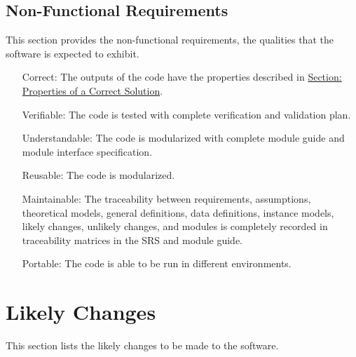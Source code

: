 \documentclass[12pt]{article}
\begin{document}
\subsection{Non-Functional Requirements}
\label{Sec:NFRs}
This section provides the non-functional requirements, the qualities that the software is expected to exhibit.

\begin{itemize}
\item[Correct:\phantomsection\label{correct}]The outputs of the code have the properties described in \hyperref[Sec:CorSolProps]{Section: Properties of a Correct Solution}.
\item[Verifiable:\phantomsection\label{verifiable}]The code is tested with complete verification and validation plan.
\item[Understandable:\phantomsection\label{understandable}]The code is modularized with complete module guide and module interface specification.
\item[Reusable:\phantomsection\label{reusable}]The code is modularized.
\item[Maintainable:\phantomsection\label{maintainable}]The traceability between requirements, assumptions, theoretical models, general definitions, data definitions, instance models, likely changes, unlikely changes, and modules is completely recorded in traceability matrices in the SRS and module guide.
\item[Portable:\phantomsection\label{portable}]The code is able to be run in different environments.
\end{itemize}
\section{Likely Changes}
\label{Sec:LCs}
This section lists the likely changes to be made to the software.
\end{document}
